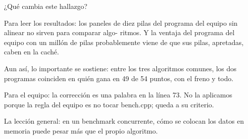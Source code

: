 ¿Qué cambia este hallazgo?

Para leer los resultados: los paneles de diez pilas del programa del equipo sin alinear no sirven para comparar algo- ritmos. Y la ventaja del programa del equipo con un millón de pilas probablemente viene de que sus pilas, apretadas, caben en la caché.

Aun así, lo importante se sostiene: entre los tres algoritmos comunes, los dos programas coinciden en quién gana en 49 de 54 puntos, con el freno y todo.

Para el equipo: la corrección es una palabra en la línea 73. No la aplicamos porque la regla del equipo es no tocar bench.cpp; queda a su criterio.

La lección general: en un benchmark concurrente, cómo se colocan los datos en memoria puede pesar más que el propio algoritmo.
